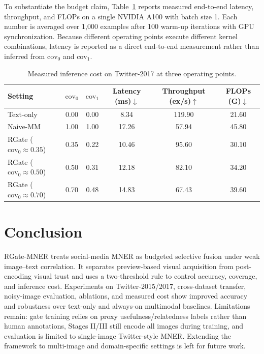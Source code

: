 \documentclass{llncs}
\begin{document}
To substantiate the budget claim, Table~\ref{tab:cost} reports measured end-to-end latency, throughput, and FLOPs on a single NVIDIA A100 with batch size 1. Each number is averaged over 1{,}000 examples after 100 warm-up iterations with GPU synchronization. Because different operating points execute different kernel combinations, latency is reported as a direct end-to-end measurement rather than inferred from $\mathrm{cov}_0$ and $\mathrm{cov}_1$.
\FloatBarrier
\begin{table}[!htbp]
\caption{Measured inference cost on Twitter-2017 at three operating points.}
\centering
\footnotesize
\setlength{\tabcolsep}{3pt}
\renewcommand{\arraystretch}{0.95}
\begin{tabular}{lccccc}
\toprule
Setting & $\mathrm{cov}_0$ & $\mathrm{cov}_1$ & Latency (ms)$\downarrow$ & Throughput (ex/s)$\uparrow$ & FLOPs (G)$\downarrow$ \\
\midrule
Text-only & 0.00 & 0.00 & 8.34 & 119.90 & 21.60 \\
Naive-MM & 1.00 & 1.00 & 17.26 & 57.94 & 45.80 \\
RGate ($\mathrm{cov}_0\!\approx\!0.35$) & 0.35 & 0.22 & 10.46 & 95.60 & 30.10 \\
RGate ($\mathrm{cov}_0\!\approx\!0.50$) & 0.50 & 0.31 & 12.18 & 82.10 & 34.20 \\
RGate ($\mathrm{cov}_0\!\approx\!0.70$) & 0.70 & 0.48 & 14.83 & 67.43 & 39.60 \\
\bottomrule
\end{tabular}
\label{tab:cost}
\end{table}
\FloatBarrier

\section{Conclusion}
RGate-MNER treats social-media MNER as budgeted selective fusion under weak image--text correlation. It separates preview-based visual acquisition from post-encoding visual trust and uses a two-threshold rule to control accuracy, coverage, and inference cost. Experiments on Twitter-2015/2017, cross-dataset transfer, noisy-image evaluation, ablations, and measured cost show improved accuracy and robustness over text-only and always-on multimodal baselines. Limitations remain: gate training relies on proxy usefulness/relatedness labels rather than human annotations, Stages II/III still encode all images during training, and evaluation is limited to single-image Twitter-style MNER. Extending the framework to multi-image and domain-specific settings is left for future work.
\end{document}

